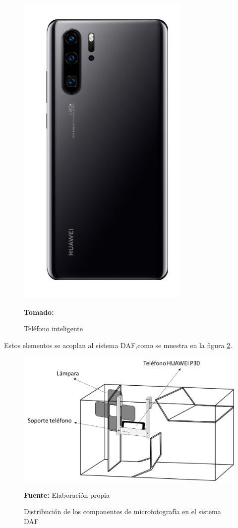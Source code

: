 \documentclass[12pt,twocolumn,a4paper]{article}
\begin{document}
\begin{figure}[h]
	\centering
	\includegraphics[scale=0.3]{hawei.png}
	\caption{Teléfono inteligente} \textbf{Tomado:} \cite{Hawei} 
	\label{hawei}
\end{figure}

Estos elementos se acoplan al sistema DAF,como se muestra en la figura \ref{disDAF}.

\begin{figure}[h]
	\centering
	\includegraphics[scale=0.3]{Distribucion2.png}
	\caption{Distribución de los componentes de microfotografía en el sistema DAF} \textbf{Fuente:} Elaboración propia
	\label{disDAF}
\end{figure}
\end{document}
